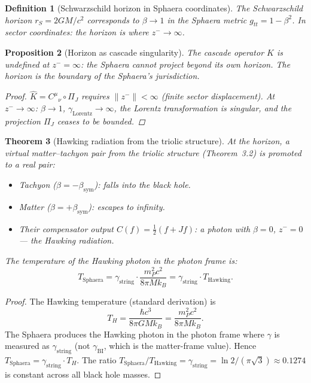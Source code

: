 \documentclass[12pt,a4paper]{article}
\newtheorem{theorem}{Theorem}[section]
\newtheorem{proposition}[theorem]{Proposition}
\newtheorem{definition}[theorem]{Definition}
\newcommand{\bsym}{\beta_{\mathrm{sym}}}
\newcommand{\gstring}{\gamma_{\mathrm{string}}}
\newcommand{\gBI}{\gamma_{\mathrm{BI}}}
\newcommand{\zminus}{z^-}
\newcommand{\KC}{\hat{K}}
\begin{document}
\begin{definition}[Schwarzschild horizon in Sphaera coordinates]
The Schwarzschild horizon $r_S=2GM/c^2$ corresponds to $\beta\to 1$ in
the Sphaera metric $g_{tt}=1-\beta^2$.
In sector coordinates: the horizon is where $\zminus\to\infty$.
\end{definition}

\begin{proposition}[Horizon as cascade singularity]
The cascade operator $\KC$ is undefined at $\zminus=\infty$: the Sphaera
cannot project beyond its own horizon.
The horizon is the boundary of the Sphaera's jurisdiction.
\begin{proof}
$\KC=C^\mu{}_\nu\circ\Pi_J$ requires $\|\zminus\|<\infty$
(finite sector displacement).
At $\zminus\to\infty$: $\beta\to 1$, $\gamma_{\mathrm{Lorentz}}\to\infty$,
the Lorentz transformation is singular, and the projection $\Pi_J$ ceases
to be bounded.
\end{proof}
\end{proposition}

\begin{theorem}[Hawking radiation from the triolic structure]
At the horizon, a virtual matter--tachyon pair from the triolic structure
(Theorem~3.2) is promoted to a real pair:
\begin{itemize}
  \item Tachyon ($\beta=-\bsym$): falls into the black hole.
  \item Matter ($\beta=+\bsym$): escapes to infinity.
  \item Their compensator output $C(f)=\tfrac{1}{2}(f+Jf)$: a photon
        with $\beta=0$, $\zminus=0$ --- the Hawking radiation.
\end{itemize}
The temperature of the Hawking photon in the photon frame is:
\[
  T_{\mathrm{Sphaera}}
  = \gstring\cdot\frac{m_P^2 c^2}{8\pi M k_B}
  = \gstring\cdot T_{\mathrm{Hawking}}.
\]
\end{theorem}

\begin{proof}
The Hawking temperature (standard derivation) is
\[
T_H = \frac{\hbar c^3}{8\pi G M k_B} = \frac{m_P^2 c^2}{8\pi M k_B}.
\]
The Sphaera produces the Hawking photon in the photon frame where
$\gamma$ is measured as $\gstring$ (not $\gBI$, which is the
matter-frame value).
Hence $T_{\mathrm{Sphaera}} = \gstring\cdot T_H$.
The ratio $T_{\mathrm{Sphaera}}/T_{\mathrm{Hawking}}=\gstring
=\ln 2/(\pi\sqrt{3})\approx 0.1274$ is constant across all black hole
masses.
\end{proof}
\end{document}
